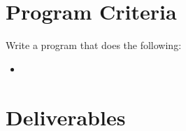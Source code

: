 \documentclass{article}
\def\prog#1{
\vspace{.1in}\begin{mdframed} \begin{center} \textbf{Programming Reminders} \end{center}#1 \end{mdframed} }
\begin{document}
	
	
	
	
	
	
	
	




\section*{Program Criteria}
	Write a program that does the following:
	\begin{itemize}
		\item
	\end{itemize}







\section*{Deliverables}
	
	

	
\end{document}

